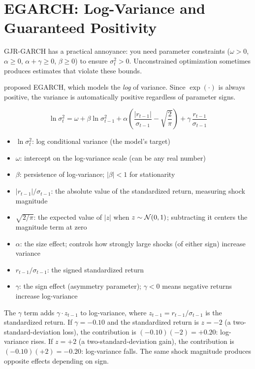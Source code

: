 \section{EGARCH: Log-Variance and Guaranteed Positivity}
\label{sec:egarch}

GJR-GARCH has a practical annoyance: you need parameter constraints
($\omega > 0$, $\alpha \geq 0$, $\alpha + \gamma \geq 0$, $\beta \geq 0$) to
ensure $\sigma^2_t > 0$. Unconstrained optimization sometimes produces estimates
that violate these bounds.

\citet{nelson1991} proposed EGARCH, which models the \emph{log} of variance. Since
$\exp(\cdot)$ is always positive, the variance is automatically positive regardless
of parameter signs.

\begin{equation}
\label{eq:egarch}
\ln \sigma^2_t
  = \omega
  + \beta \ln \sigma^2_{t-1}
  + \alpha \left( \frac{|r_{t-1}|}{\sigma_{t-1}} - \sqrt{\frac{2}{\pi}} \right)
  + \gamma \, \frac{r_{t-1}}{\sigma_{t-1}}
\end{equation}
%
\begin{itemize}[nosep]
  \item $\ln \sigma^2_t$: log conditional variance (the model's target)
  \item $\omega$: intercept on the log-variance scale (can be any real number)
  \item $\beta$: persistence of log-variance; $|\beta| < 1$ for stationarity
  \item $|r_{t-1}|/\sigma_{t-1}$: the absolute value of the standardized return,
        measuring shock magnitude
  \item $\sqrt{2/\pi}$: the expected value of $|z|$ when $z \sim \mathcal{N}(0,1)$;
        subtracting it centers the magnitude term at zero
  \item $\alpha$: the size effect; controls how strongly large shocks (of either
        sign) increase variance
  \item $r_{t-1}/\sigma_{t-1}$: the signed standardized return
  \item $\gamma$: the sign effect (asymmetry parameter); $\gamma < 0$ means
        negative returns increase log-variance
\end{itemize}

\begin{intuition}
The $\gamma$ term adds $\gamma \cdot z_{t-1}$ to log-variance, where
$z_{t-1} = r_{t-1}/\sigma_{t-1}$ is the standardized return. If $\gamma = -0.10$
and the standardized return is $z = -2$ (a two-standard-deviation loss), the
contribution is $(-0.10)(-2) = +0.20$: log-variance rises. If $z = +2$ (a
two-standard-deviation gain), the contribution is $(-0.10)(+2) = -0.20$:
log-variance falls. The same shock magnitude produces opposite effects depending on
sign.
\end{intuition}

